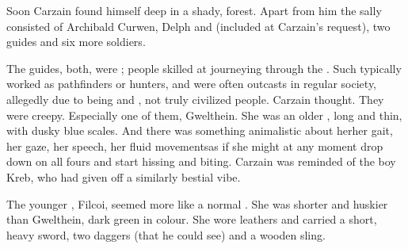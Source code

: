 \new
{}
% 
Soon Carzain found himself deep in a shady, \Wylde{} forest. 
Apart from him the sally consisted of Archibald Curwen, Delph and \Tsekkect{} (included at Carzain's request), two guides and six more soldiers. 

The guides, \sphyles{} both, were ; people skilled at journeying through the \Wylde{}. 
Such \rangers{} typically worked as pathfinders or hunters, and were often outcasts in regular society, allegedly due to being \quo{\Wylde{}} and , not truly civilized people. 
 Carzain thought. 
They were creepy. 
Especially one of them, Gwelthein. 
She was an older \sphyle, long and thin, with dusky blue scales. 
And there was something animalistic about her\dash her gait, her gaze, her speech, her fluid movements\dash as if she might at any moment drop down on all fours and start hissing and biting. 
Carzain was reminded of the boy Kreb, who had given off a similarly bestial vibe. 

The younger \ranger, Filcoi, seemed more like a normal \scatha. 
She was shorter and huskier than Gwelthein, dark green in colour. 
She wore leathers and carried a short, heavy sword, two daggers (that he could see) and a wooden sling. 

